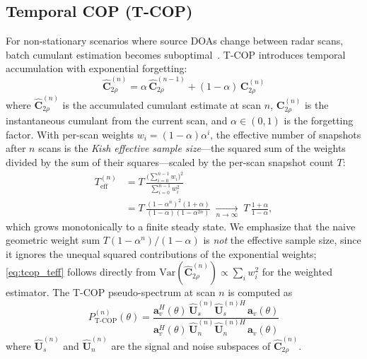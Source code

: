 \documentclass[journal]{IEEEtran}
\newcommand{\mat}[1]{\mathbf{#1}}
\begin{document}
\subsection{Temporal COP (T-COP)}
\label{sec:tcop}

For non-stationary scenarios where source DOAs change between radar scans, batch cumulant estimation becomes suboptimal~\cite{tufts1982estimation}. T-COP introduces temporal accumulation with exponential forgetting:
\begin{equation}
\hat{\mat{C}}_{2\rho}^{(n)} = \alpha\,\hat{\mat{C}}_{2\rho}^{(n-1)} + (1-\alpha)\,\mat{C}_{2\rho}^{(n)}
\label{eq:tcop_accumulation}
\end{equation}
where $\hat{\mat{C}}_{2\rho}^{(n)}$ is the accumulated cumulant estimate at scan $n$, $\mat{C}_{2\rho}^{(n)}$ is the instantaneous cumulant from the current scan, and $\alpha \in (0, 1)$ is the forgetting factor. With per-scan weights $w_i = (1-\alpha)\alpha^{i}$, the effective number of snapshots after $n$ scans is the \emph{Kish effective sample size}---the squared sum of the weights divided by the sum of their squares---scaled by the per-scan snapshot count $T$:
\begin{equation}
\begin{split}
T_{\mathrm{eff}}^{(n)} &= T\,\frac{\big(\sum_{i=0}^{n-1} w_i\big)^2}{\sum_{i=0}^{n-1} w_i^2}\\
&= T\,\frac{(1-\alpha^{n})^2(1+\alpha)}{(1-\alpha)(1-\alpha^{2n})}
\;\xrightarrow[n\to\infty]{}\; T\,\frac{1+\alpha}{1-\alpha},
\end{split}
\label{eq:tcop_teff}
\end{equation}
which grows monotonically to a finite steady state. We emphasize that the naive geometric weight sum $T(1-\alpha^{n})/(1-\alpha)$ is \emph{not} the effective sample size, since it ignores the unequal squared contributions of the exponential weights; \eqref{eq:tcop_teff} follows directly from $\mathrm{Var}(\hat{\mat{C}}_{2\rho}^{(n)}) \propto \sum_i w_i^2$ for the weighted estimator. The T-COP pseudo-spectrum at scan $n$ is computed as
\begin{equation}
P_{\mathrm{T\text{-}COP}}^{(n)}(\theta) = \frac{\mat{a}_v^H(\theta)\,\hat{\mat{U}}_s^{(n)}\hat{\mat{U}}_s^{(n)H}\,\mat{a}_v(\theta)}{\mat{a}_v^H(\theta)\,\hat{\mat{U}}_n^{(n)}\hat{\mat{U}}_n^{(n)H}\,\mat{a}_v(\theta)}
\label{eq:tcop_spectrum}
\end{equation}
where $\hat{\mat{U}}_s^{(n)}$ and $\hat{\mat{U}}_n^{(n)}$ are the signal and noise subspaces of $\hat{\mat{C}}_{2\rho}^{(n)}$.
\end{document}
